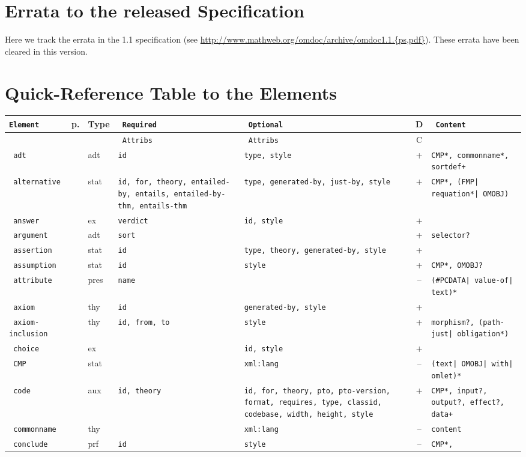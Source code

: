 \begin{appendix}
\chapter{Errata to the released Specification}
Here we track the errata in the {\omdoc} 1.1 specification (see
{\url{http://www.mathweb.org/omdoc/archive/omdoc1.1.{ps,pdf}}}). These errata have
been cleared in this version.




\chapter{Quick-Reference Table to the {\else{\omdoc}\fi} Elements}\label{sec:table}
\def\tabelt#1#2#3#4#5#6{{#1}&\pageref{eldef:#1}&{#2}&{#3}&{#4}&{#5}&{#6}\\\hline}
\def\generalcat{struct}\def\cfmpcat{stat}\def\mathcat{stat}\def\proofcat{prf}\def\constcat{thy}
\def\adtcat{adt}\def\cpxtcat{thy}\def\auxcat{aux}\def\metacat{meta}\def\prescat{pres}\def\excat{ex}
 {\scriptsize
\begin{longtable}{|>{\tt}p{2.1cm}|l|l|>{\tt}p{2cm}|>{\tt}p{2cm}|c|>{\tt}p{3cm}|}\hline
{\rm Element}& p. & Type  & {\rm Required}  & {\rm Optional} & D & Content \\\hline
             & &        & {\rm Attribs}  & {\rm Attribs} & C &        \\\hline\hline
\tabelt{adt}\adtcat{id}{type, style}{+}{CMP*, commonname*, sortdef+}
\tabelt{alternative}\mathcat{id, for, theory, entailed-by, entails,
             entailed-by-thm, entails-thm}{type, generated-by, just-by,
             style}{+}{CMP*, (FMP| requation*| OMOBJ)}
\tabelt{answer}\excat{verdict}{id, style}{+}{{\cfm}}
\tabelt{argument}\adtcat{sort}{}{+}{selector?}
\tabelt{assertion}\mathcat{id}{type, theory, generated-by, style}{+}{{\cfm}}
\tabelt{assumption}\cfmpcat{id}{style}{+}{CMP*, OMOBJ?}
\tabelt{attribute}\prescat{name}{}{--}{(\#PCDATA| value-of| text)*}
\tabelt{axiom}\constcat{id}{generated-by, style}{+}{{\cfm}}
\tabelt{axiom-inclusion}\cpxtcat{id, from, to}{style}{+}{morphism?, (path-just| obligation*)}\hline
\tabelt{choice}\excat{}{id, style}{+}{{\cfm}}
\tabelt{CMP}\cfmpcat{}{xml:lang}{--}{({\rm text}| OMOBJ| with| omlet)*}
\tabelt{code}\auxcat{id, theory}{id, for, theory, pto, pto-version, format,
             requires, type, classid, codebase, width, height, style}{+}{CMP*, input?, output?, effect?, data+}
\tabelt{commonname}\constcat{}{xml:lang}{--}{{\rm{\element{CMP}}content}}
\tabelt{conclude}\proofcat{id}{style}{--}{CMP*, \justmatter}

\end{longtable}}
\end{appendix}
